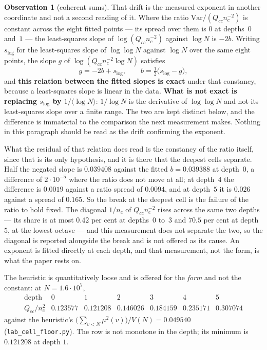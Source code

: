 \documentclass[11pt,a4paper]{article}
\theoremstyle{plain}
\theoremstyle{definition}
\newtheorem{observation}[theorem]{Observation}
\theoremstyle{remark}
\begin{document}
\begin{observation}[coherent sums]
That drift is the measured exponent in another coordinate and not a
second reading of it. Where the ratio $\mathrm{Var}/(Q_{cc}n_c^{-2})$
is constant across the eight fitted points --- its spread over them is
$0$ at depths~$0$ and~$1$ --- the least-squares slope of
$\log(Q_{cc}n_c^{-2})$ against $\log N$ is $-2b$. Writing $s_{\log}$
for the least-squares slope of $\log\log N$ against $\log N$ over the
same eight points, the slope $g$ of $\log(Q_{cc}n_c^{-2}\log N)$
satisfies
\[
  g=-2b+s_{\log},\qquad b=\tfrac12\bigl(s_{\log}-g\bigr),
\]
and \textbf{this relation between the fitted slopes is exact} under
that constancy, because a least-squares slope is linear in the data.
\textbf{What is not exact is replacing $s_{\log}$ by
$1/\langle\log N\rangle$}: $1/\log N$ is the derivative of $\log\log N$
and not its least-squares slope over a finite range. The two are kept
distinct below, and the difference is immaterial to the comparison the
next measurement makes.
Nothing in this paragraph should be read as the drift confirming the
exponent.

What the residual of that relation does read is the constancy of the
ratio itself, since that is its only hypothesis, and it is there that
the deepest cells separate. Half the negated slope is $0.039408$
against the fitted $b=0.039388$ at depth~$0$, a difference of
$2\cdot10^{-5}$ where the ratio does not move at all; at depth~$4$ the
difference is $0.0019$ against a ratio spread of $0.0094$, and at
depth~$5$ it is $0.026$ against a spread of $0.165$. So the break at
the deepest cell is the failure of the ratio to hold fixed. The
diagonal $1/n_c$ of $Q_{cc}n_c^{-2}$ rises across the same two
depths --- its share is at most $0.42$ per cent at depths~$0$ to~$3$
and $70.5$ per cent at depth~$5$, at the lowest octave --- and this
measurement does not separate the two, so the diagonal is reported
alongside the break and is not offered as its cause. An exponent is
fitted directly at each depth, and that measurement, not the form, is
what the paper rests on.
\end{observation}

The heuristic is quantitatively loose and is offered for the
\emph{form} and not the constant: at $N=1.6\cdot10^7$,
\[
\begin{array}{r|cccccc}
 \text{depth} & 0 & 1 & 2 & 3 & 4 & 5\\\hline
 Q_{cc}/n_c^2 & 0.123577 & 0.121208 & 0.146026 & 0.184159 & 0.235171
   & 0.307074
\end{array}
\]
against the heuristic's
$\bigl(\sum_{v<N}\mu^2(v)\bigr)/V(N)=0.049540$
(\texttt{lab\_cell\_floor.py}). The row is not monotone in the depth;
its minimum is $0.121208$ at depth $1$.
\end{document}
